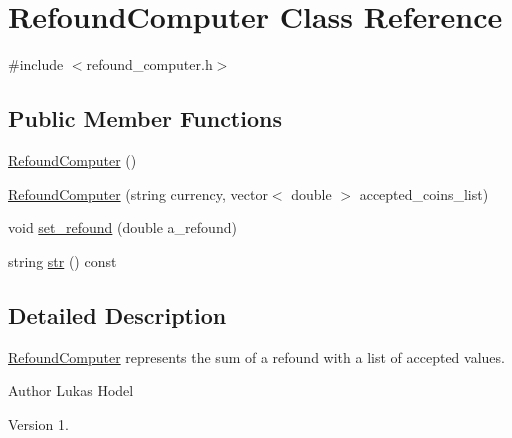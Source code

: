 \hypertarget{classRefoundComputer}{\section{Refound\-Computer Class Reference}
\label{classRefoundComputer}
}


{\ttfamily \#include $<$refound\-\_\-computer.\-h$>$}

\subsection*{Public Member Functions}
\begin{DoxyCompactItemize}
\item 
\hyperlink{classRefoundComputer_a48f52d711a12490074da778084fa9b19}{Refound\-Computer} ()
\item 
\hyperlink{classRefoundComputer_aeda2206b8e58332ab9b7873f0b3a7419}{Refound\-Computer} (string currency, vector$<$ double $>$ accepted\-\_\-coins\-\_\-list)
\item 
void \hyperlink{classRefoundComputer_a2ed7a4501d14097325c5575fa3c5eab7}{set\-\_\-refound} (double a\-\_\-refound)
\item 
string \hyperlink{classRefoundComputer_a94f386e9c403ffc5e47e50628be4731f}{str} () const 
\end{DoxyCompactItemize}


\subsection{Detailed Description}
\hyperlink{classRefoundComputer}{Refound\-Computer} represents the sum of a refound with a list of accepted values.

\begin{DoxyAuthor}{Author}
Lukas Hodel 
\end{DoxyAuthor}
\begin{DoxyVersion}{Version}
1. 
\end{DoxyVersion}


